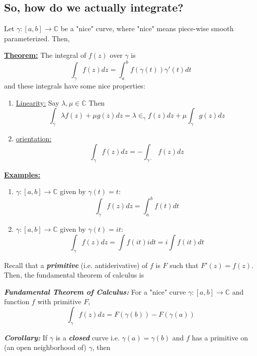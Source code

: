 \documentclass{article}
\newcommand{\C}{\mathbb{C}}
\begin{document}
\vskip 0.5cm
\subsection{So, how do we actually integrate?}
Let $\gamma : [a, b] \rightarrow \C$ be a "nice" curve, where "nice" means piece-wise smooth parameterized. Then,

\vskip 0.5cm
\begin{dottedbox}
  \underline{\textbf{Theorem:}} The integral of $f(z)$ over $\gamma$ is
  \[ \int_{\gamma} f(z) dz = \int_{a}^{b} f(\gamma(t)) \gamma'(t) dt \]
  and these integrals have some nice properties:
  \begin{enumerate}
    \item \underline{Linearity:} Say $\lambda, \mu \in \C$ Then
    \[ \int_{\gamma} \lambda f(z) + \mu g(z) dz = \lambda \in_{\gamma} f(z)dz + \mu \int_{\gamma} g(z)dz \]

    \item \underline{orientation:} 
    \[ \int_{\gamma} f(z) dz = - \int_{\gamma^{-}} f(z) dz \]
  \end{enumerate} 
\end{dottedbox}

\vskip 0.5cm
\underline{\textbf{Examples:}}
\begin{enumerate}[label=(\alph*)]
  \item $\gamma : [a,b] \rightarrow \C$ given by $\gamma(t) = t$:
  \[ \int_{\gamma} f(z)dz = \int_{a}^{b} f(t)dt \]

  \item $\gamma : [a,b] \rightarrow \C$ given by $\gamma(t) = it$:
  \[ \int_{\gamma} f(z)dz = \int f(it) i dt = i \int f(it) dt \]
\end{enumerate}

\vskip 0.5cm
Recall that a \textbf{\emph{primitive}} (i.e. antiderivative) of $f$ is $F$ such that $F'(z) = f(z)$. Then, the fundamental theorem of calculus is

\begin{dottedbox}
  \textbf{\emph{Fundamental Theorem of Calculus:}} For a "nice" curve $\gamma : [a,b] \rightarrow \C$ and function $f$ with primitive $F$,
  \[ \int_{\gamma} f(z)dz = F(\gamma(b)) - F(\gamma(a)) \]
\end{dottedbox}

\vskip 0.5cm
\textbf{\emph{Corollary:}} If $\gamma$ is a \textbf{\emph{closed}} curve i.e. $\gamma(a) = \gamma(b)$ and $f$ has a primitive on (an open neighborhood of) $\gamma$, then 
\end{document}
